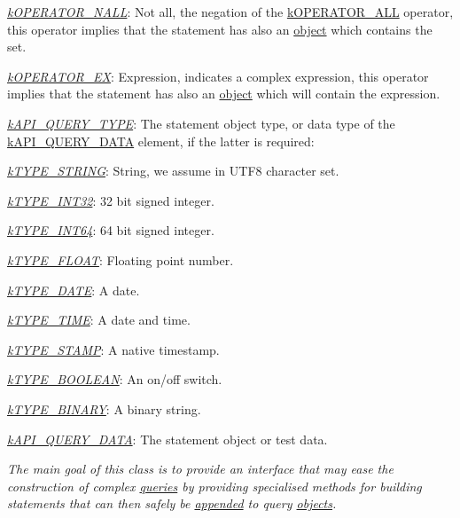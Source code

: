 {\begin{DoxyItemize}
\begin{DoxyItemize}
\item {\itshape \hyperlink{}{k\-O\-P\-E\-R\-A\-T\-O\-R\-\_\-\-N\-A\-L\-L}}\-: Not all, the negation of the \hyperlink{}{k\-O\-P\-E\-R\-A\-T\-O\-R\-\_\-\-A\-L\-L} operator, this operator implies that the statement has also an \hyperlink{}{object} which contains the set. 
\item {\itshape \hyperlink{}{k\-O\-P\-E\-R\-A\-T\-O\-R\-\_\-\-E\-X}}\-: Expression, indicates a complex expression, this operator implies that the statement has also an \hyperlink{}{object} which will contain the expression. 
\end{DoxyItemize}
\item {\itshape \hyperlink{}{k\-A\-P\-I\-\_\-\-Q\-U\-E\-R\-Y\-\_\-\-T\-Y\-P\-E}}\-: The statement object type, or data type of the \hyperlink{}{k\-A\-P\-I\-\_\-\-Q\-U\-E\-R\-Y\-\_\-\-D\-A\-T\-A} element, if the latter is required\-: 
\begin{DoxyItemize}
\item {\itshape \hyperlink{}{k\-T\-Y\-P\-E\-\_\-\-S\-T\-R\-I\-N\-G}}\-: String, we assume in U\-T\-F8 character set. 
\item {\itshape \hyperlink{}{k\-T\-Y\-P\-E\-\_\-\-I\-N\-T32}}\-: 32 bit signed integer. 
\item {\itshape \hyperlink{}{k\-T\-Y\-P\-E\-\_\-\-I\-N\-T64}}\-: 64 bit signed integer. 
\item {\itshape \hyperlink{}{k\-T\-Y\-P\-E\-\_\-\-F\-L\-O\-A\-T}}\-: Floating point number. 
\item {\itshape \hyperlink{}{k\-T\-Y\-P\-E\-\_\-\-D\-A\-T\-E}}\-: A date. 
\item {\itshape \hyperlink{}{k\-T\-Y\-P\-E\-\_\-\-T\-I\-M\-E}}\-: A date and time. 
\item {\itshape \hyperlink{}{k\-T\-Y\-P\-E\-\_\-\-S\-T\-A\-M\-P}}\-: A native timestamp. 
\item {\itshape \hyperlink{}{k\-T\-Y\-P\-E\-\_\-\-B\-O\-O\-L\-E\-A\-N}}\-: An on/off switch. 
\item {\itshape \hyperlink{}{k\-T\-Y\-P\-E\-\_\-\-B\-I\-N\-A\-R\-Y}}\-: A binary string. 
\end{DoxyItemize}
\item {\itshape \hyperlink{}{k\-A\-P\-I\-\_\-\-Q\-U\-E\-R\-Y\-\_\-\-D\-A\-T\-A}}\-: The statement object or test data. 
\end{DoxyItemize}}

{\itshape The main goal of this class is to provide an interface that may ease the construction of complex \hyperlink{class_c_query}{queries} by providing specialised methods for building statements that can then safely be \hyperlink{class_c_query_a6cd7ba8e153fc299ba87b614ccb56486}{appended} to query \hyperlink{class_c_query}{objects}.}

